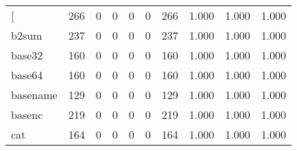 \begin{longtable}{lp{1.3cm}p{1.3cm}p{1.3cm}p{1.3cm}p{1.3cm}p{1.3cm}p{1.3cm}p{1.3cm}p{1.3cm}}
\bottomrule
\endlastfoot
{[}         &                    266 &                                  0 &                                 0 &                                0 &                                 0 &                             266 &                                   1.000 &                                  1.000 &                                1.000 \\
b2sum     &                    237 &                                  0 &                                 0 &                                0 &                                 0 &                             237 &                                   1.000 &                                  1.000 &                                1.000 \\
base32    &                    160 &                                  0 &                                 0 &                                0 &                                 0 &                             160 &                                   1.000 &                                  1.000 &                                1.000 \\
base64    &                    160 &                                  0 &                                 0 &                                0 &                                 0 &                             160 &                                   1.000 &                                  1.000 &                                1.000 \\
basename  &                    129 &                                  0 &                                 0 &                                0 &                                 0 &                             129 &                                   1.000 &                                  1.000 &                                1.000 \\
basenc    &                    219 &                                  0 &                                 0 &                                0 &                                 0 &                             219 &                                   1.000 &                                  1.000 &                                1.000 \\
cat       &                    164 &                                  0 &                                 0 &                                0 &                                 0 &                             164 &                                   1.000 &                                  1.000 &                                1.000 \\

\end{longtable}
